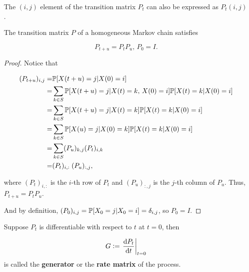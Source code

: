 \begin{remark}
    The $(i,j)$ element of the transition matrix $P_t$ can also be expressed as $P_t(i, j)$.
\end{remark}

\begin{theorem}
    The transition matrix $P$ of a homogeneous Markov chain satisfies

    \begin{equation*}
        P_{t+u} = P_t P_u, \, P_0 = I.
    \end{equation*}

    \begin{proof}
        Notice that

        \begin{align*}
            (P_{t+u})_{i,j} = & \mathbb{P}[X(t+u) = j | X(0) = i] \\ 
            = & \sum_{k \in S} \mathbb{P}[X(t+u) = j | X(t) = k, \, X(0) = i] \mathbb{P}[X(t) = k | X(0) = i] \\ 
            = & \sum_{k \in S} \mathbb{P}[X(t+u) = j | X(t) = k] \mathbb{P}[X(t) = k | X(0) = i] \\ 
            = & \sum_{k \in S} \mathbb{P}[X(u) = j | X(0) = k] \mathbb{P}[X(t) = k | X(0) = i] \\ 
            = & \sum_{k \in S} (P_u)_{k, j} (P_t)_{i, k} \\ 
            = & (P_t)_{i, :} \; (P_u)_{:, j},
        \end{align*}

        where $(P_t)_{i, :}$ is the $i$-th row of $P_t$ and $(P_u)_{:, j}$ is the $j$-th column of $P_u$. Thus, $P_{t+u} = P_t P_u$. 

        And by definition, $(P_0)_{i,j} = \mathbb{P}[X_0 = j | X_0 = i] = \delta_{i,j}$, so $P_0 = I$.
    \end{proof}
\end{theorem}

\begin{definition}
    Suppose $P_t$ is differentiable with respect to $t$ at $t = 0$, then 

    \begin{equation*}
        G :=  \left. \frac{\dif P_t}{\dif t} \right|_{t = 0}
    \end{equation*}
    is called the \textbf{generator} or the \textbf{rate matrix} of the process.
\end{definition}

